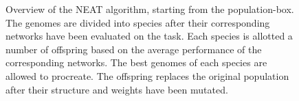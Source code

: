 \begin{figure}[htb]
\begin{mdframed}
\begin{tikzpicture}
    \end{tikzpicture}
    \end{mdframed}
    \caption{Overview of the NEAT algorithm, starting from the population-box. The genomes are
    divided into species after their corresponding networks
    have been evaluated on the task. Each species is allotted a number of offspring based on
    the average performance of the corresponding networks. The best genomes of each species are allowed
    to procreate. The offspring replaces the original population after their structure and weights have been mutated.}
    \label{neat_overview}
\end{figure}